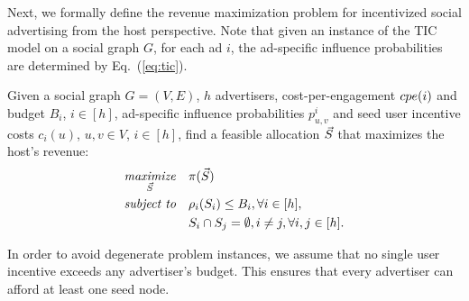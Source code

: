 \noindent Next, we formally define the revenue maximization problem for incentivized social advertising from the host perspective. Note that given an instance of the TIC model on a social graph $G$, for each ad $i$, the ad-specific influence probabilities are determined by Eq.~(\ref{eq:tic}).

\begin{problem}[\RMLong(\RM)]\label{pr:revMax}
Given a social graph $G=(V,E)$, $h$ advertisers, cost-per-engagement $cpe({i})$ and budget $B_i$, $i \in [h]$, ad-specific influence probabilities $p^i_{u,v}$  and seed user incentive costs $c_i(u)$, $u, v\in V$, $i \in [h]$, find a feasible allocation $\vec{S}$ that maximizes the host's revenue:
\begin{equation*}
\begin{aligned}
& \underset{\vec{S}}{\text{\em maximize}}
& & \pi(\vec{S}) \\
& \text{\em subject to}
& & \rho_i(S_i) \le B_i, \forall i \in [h],  \\
&&& S_i \cap S_j = \emptyset , i \neq j, \forall i,j \in [h].
\end{aligned}
\end{equation*}
\end{problem}

In order to avoid degenerate problem instances, we assume that no single user incentive 
exceeds any advertiser's budget.
This ensures that every advertiser can afford at least one seed node.
